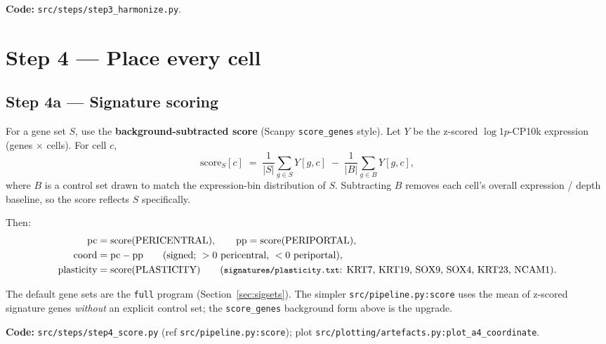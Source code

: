 \documentclass[11pt]{article}
\newcommand{\code}[1]{\texttt{\small #1}}
\newcommand{\coordc}{\mathrm{coord}}
\begin{document}
\medskip
\noindent\textbf{Code:} \code{src/steps/step3\_harmonize.py}.

\section{Step 4 --- Place every cell}

\subsection{Step 4a --- Signature scoring}
For a gene set $S$, use the \textbf{background-subtracted score} (Scanpy \code{score\_genes}
style). Let $Y$ be the z-scored $\log 1p$-CP10k expression (genes $\times$ cells). For cell $c$,
\[
  \text{score}_S[c] \;=\; \frac{1}{|S|}\sum_{g \in S} Y[g,c]
                       \;-\; \frac{1}{|B|}\sum_{g \in B} Y[g,c],
\]
where $B$ is a control set drawn to match the expression-bin distribution of $S$. Subtracting $B$
removes each cell's overall expression / depth baseline, so the score reflects $S$ specifically.

Then:
\begin{align}
  \text{pc} &= \text{score(PERICENTRAL)}, \qquad \text{pp} = \text{score(PERIPORTAL)}, \\
  \coordc   &= \text{pc} - \text{pp}
               \qquad (\text{signed; } >0 \text{ pericentral, } <0 \text{ periportal}), \\
  \text{plasticity} &= \text{score(PLASTICITY)}
               \qquad (\text{\code{signatures/plasticity.txt}: KRT7, KRT19, SOX9, SOX4, KRT23, NCAM1}).
\end{align}

The default gene sets are the \code{full} program (Section~\ref{sec:sigsets}). The simpler
\code{src/pipeline.py:score} uses the mean of z-scored signature genes \emph{without} an explicit
control set; the \code{score\_genes} background form above is the upgrade.

\medskip
\noindent\textbf{Code:} \code{src/steps/step4\_score.py} (ref \code{src/pipeline.py:score});
plot \code{src/plotting/artefacts.py:plot\_a4\_coordinate}.
\end{document}
